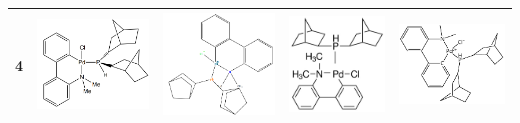 \begin{landscape}
\begin{longtable}{m{0.3cm}
                >{\centering}m{4.8cm}
                >{\centering}m{4.8cm}
                >{\centering}m{4.8cm}
                >{\centering\arraybackslash}m{4.8cm}}
 4 &
 \includegraphics[width=3.5cm]{imagenes/resultados/anexo_expertos/mol4.png} & 
 \includegraphics[width=3.5cm]{imagenes/resultados/anexo_expertos/mol4_openbabel.png} & 
 \includegraphics[width=3cm]{imagenes/sigmaAldrich/SK-CC 01A.jpeg} & 
 \includegraphics[width=3.3cm]{imagenes/sciFinder/pdf/SK-CC 01A.pdf} \\
\midrule


\end{longtable}
\end{landscape}
